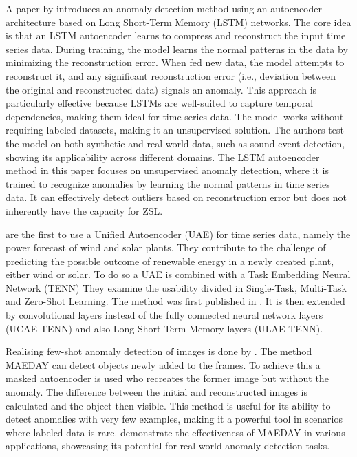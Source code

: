 A paper by \cite{provotar_unsupervised_2019} introduces an anomaly detection method using an autoencoder architecture based on Long Short-Term Memory (LSTM) networks. The core idea is that an LSTM autoencoder learns to compress and reconstruct the input time series data. During training, the model learns the normal patterns in the data by minimizing the reconstruction error. When fed new data, the model attempts to reconstruct it, and any significant reconstruction error (i.e., deviation between the original and reconstructed data) signals an anomaly. This approach is particularly effective because LSTMs are well-suited to capture temporal dependencies, making them ideal for time series data. The model works without requiring labeled datasets, making it an unsupervised solution. The authors test the model on both synthetic and real-world data, such as sound event detection, showing its applicability across different domains. The LSTM autoencoder method in this paper focuses on unsupervised anomaly detection, where it is trained to recognize anomalies by learning the normal patterns in time series data. It can effectively detect outliers based on reconstruction error but does not inherently have the capacity for ZSL.

\cite{nivarthi_multi-task_2023} are the first to use a Unified Autoencoder (UAE) for time series data, namely the power forecast of wind and solar plants. They contribute to the challenge of predicting the possible outcome of renewable energy in a newly created plant, either wind or solar. To do so a UAE is combined with a Task Embedding Neural Network (TENN) They examine the usability divided in Single-Task, Multi-Task and Zero-Shot Learning. The method was first published in \cite{nivarthi_unified_2022}. It is then extended by convolutional layers instead of the fully connected neural network layers (UCAE-TENN) and also Long Short-Term Memory layers (ULAE-TENN).

Realising few-shot anomaly detection of images is done by \cite{schwartz_maeday_2024}. The method MAEDAY can detect objects newly added to the frames. To achieve this a masked autoencoder is used who recreates the former image but without the anomaly. The difference between the initial and reconstructed images is calculated and the object then visible.
This method is useful for its ability to detect anomalies with very few examples, making it a powerful tool in scenarios where labeled data is rare. \cite{schwartz_maeday_2024} demonstrate the effectiveness of MAEDAY in various applications, showcasing its potential for real-world anomaly detection tasks.

